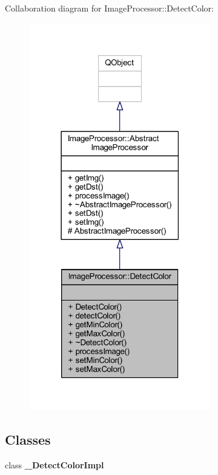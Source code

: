 Collaboration diagram for Image\+Processor\+:\+:Detect\+Color\+:\nopagebreak
\begin{figure}[H]
\begin{center}
\leavevmode
\includegraphics[width=225pt]{d6/dc2/class_image_processor_1_1_detect_color__coll__graph}
\end{center}
\end{figure}
\subsection*{Classes}
\begin{DoxyCompactItemize}
\item 
class {\bfseries \+\_\+\+Detect\+Color\+Impl}
\end{DoxyCompactItemize}
